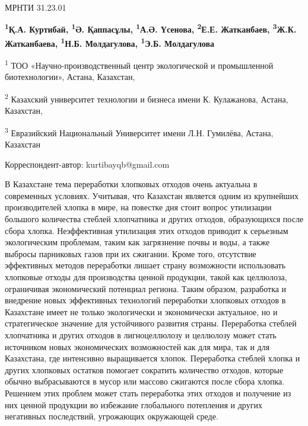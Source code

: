 \newpage
МРНТИ 31.23.01


\begin{center}
{\bfseries \textsuperscript{1}Қ.А. Куртибай, \textsuperscript{1}Ә. Қаппасұлы, \textsuperscript{1}А.Ә. Үсенова, \textsuperscript{2}Е.Е. Жатканбаев, \textsuperscript{3}Ж.К. Жатканбаева, \textsuperscript{1}Н.Б. Молдагулова, \textsuperscript{1}Э.Б. Молдагулова}

\textsuperscript{1} ТОО «Научно-производственный центр экологической и
промышленной биотехнологии», Астана, Казахстан,

\textsuperscript{2} Казахский университет технологии и бизнеса имени К.
Кулажанова, Астана, Казахстан,

\textsuperscript{3} Евразийский Национальный Университет имени Л.Н.
Гумилёва, Астана, Казахстан

Корреспондент-автор: kurtibayqb@gmail.com
\end{center}

В Казахстане тема переработки хлопковых отходов очень актуальна в
современных условиях. Учитывая, что Казахстан является одним из
крупнейших производителей хлопка в мире, на повестке дня стоит вопрос
утилизации большого количества стеблей хлопчатника и других отходов,
образующихся после сбора хлопка. Неэффективная утилизация этих отходов
приводит к серьезным экологическим проблемам, таким как загрязнение
почвы и воды, а также выбросы парниковых газов при их сжигании. Кроме
того, отсутствие эффективных методов переработки лишает страну
возможности использовать хлопковые отходы для производства ценной
продукции, такой как целлюлоза, ограничивая экономический потенциал
региона. Таким образом, разработка и внедрение новых эффективных
технологий переработки хлопковых отходов в Казахстане имеет не только
экологически и экономически актуальное, но и стратегическое значение для
устойчивого развития страны. Переработка стеблей хлопчатника и других
отходов в лигноцеллюлозу и целлюлозу может стать источником новых
экономических возможностей как для мира, так и для Казахстана, где
интенсивно выращивается хлопок. Переработка стеблей хлопка и других
хлопковых остатков помогает сократить количество отходов, которые обычно
выбрасываются в мусор или массово сжигаются после сбора хлопка. Решением
этих проблем может стать переработка этих отходов и получение из них
ценной продукции во избежание глобального потепления и других негативных
последствий, угрожающих окружающей среде.

